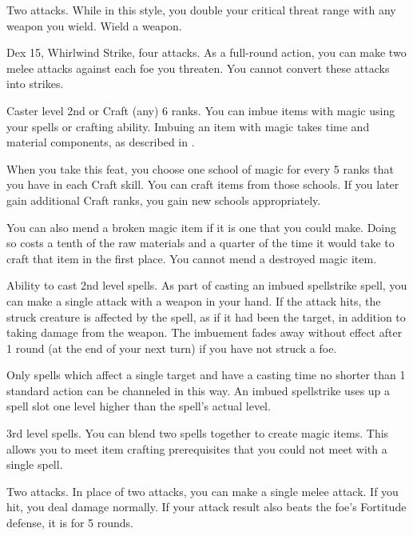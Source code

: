 \featpre Two attacks.
\featben While in this style, you double your critical threat range with any weapon you wield.
\stylereq Wield a weapon.

\featpres Dex 15, Whirlwind Strike, four attacks.
\featben As a full-round action, you can make two melee attacks against each foe you threaten. You cannot convert these attacks into strikes.

\featpre Caster level 2nd or Craft (any) 6 ranks.
\featben You can imbue items with magic using your spells or crafting ability.
Imbuing an item with magic takes time and material components, as described in .

When you take this feat, you choose one school of magic for every 5 ranks that you have in each Craft skill.
You can craft items from those schools.
If you later gain additional Craft ranks, you gain new schools appropriately.

You can also mend a broken magic item if it is one that you could make.
Doing so costs a tenth of the raw materials and a quarter of the time it would take to craft that item in the first place.
You cannot mend a destroyed magic item.

\featpre Ability to cast 2nd level spells.
\featben As part of casting an imbued spellstrike spell, you can make a single attack with a weapon in your hand.
If the attack hits, the struck creature is affected by the spell, as if it had been the target, in addition to taking damage from the weapon.
The imbuement fades away without effect after 1 round (at the end of your next turn) if you have not struck a foe.

Only spells which affect a single target and have a casting time no shorter than 1 standard action can be channeled in this way.
An imbued spellstrike uses up a spell slot one level higher than the spell's actual level.

\featpre 3rd level spells.
\featben You can blend two spells together to create magic items.
This allows you to meet item crafting prerequisites that you could not meet with a single spell.

\featpre Two attacks.
\featben In place of two attacks, you can make a single melee attack.
If you hit, you deal damage normally.
If your attack result also beats the foe's Fortitude defense, it is \immobilized for 5 rounds.

